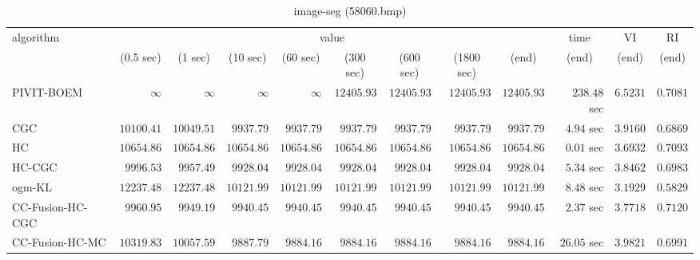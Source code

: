 \begin{table}[H]
\scriptsize
\centering
\caption{image-seg (58060.bmp)}
\label{tab:anytimetable-image-seg-58060.bmp}
\begin{tabular}{lrrrrrrrrrrr}
\toprule
           algorithm &                                   \multicolumn{8}{c}{value} & \multicolumn{1}{c}{time}    & \multicolumn{1}{c}{VI}  & \multicolumn{1}{c}{RI} \\  
\cmidrule(lr){2-9}\cmidrule(lr){10-10} \cmidrule(lr){11-11} \cmidrule(lr){12-12}   
                     & \multicolumn{1}{c}{(0.5 sec)} & \multicolumn{1}{c}{(1 sec)} & \multicolumn{1}{c}{(10 sec)} & \multicolumn{1}{c}{(60 sec)} & \multicolumn{1}{c}{(300 sec)} & \multicolumn{1}{c}{(600 sec)} & \multicolumn{1}{c}{(1800 sec)} & \multicolumn{1}{c}{(end)} & \multicolumn{1}{c}{(end)}    & \multicolumn{1}{c}{(end)}   & \multicolumn{1}{c}{(end)}  \\ \midrule 
          PIVIT-BOEM & $\infty$ & $\infty$ & $\infty$ & $\infty$ & $     12405.93$ & $     12405.93$ & $     12405.93$ & $     12405.93$ & $       238.48$ sec    & $       6.5231$  & $       0.7081$ \\ 
                 CGC & $     10100.41$ & $     10049.51$ & $      9937.79$ & $      9937.79$ & $      9937.79$ & $      9937.79$ & $      9937.79$ & $      9937.79$ & $         4.94$ sec    & $       3.9160$  & $       0.6869$ \\ 
                  HC & $     10654.86$ & $     10654.86$ & $     10654.86$ & $     10654.86$ & $     10654.86$ & $     10654.86$ & $     10654.86$ & $     10654.86$ & $         0.01$ sec    & $       3.6932$  & $       0.7093$ \\ 
              HC-CGC & $      9996.53$ & $      9957.49$ & $      9928.04$ & $      9928.04$ & $      9928.04$ & $      9928.04$ & $      9928.04$ & $      9928.04$ & $         5.34$ sec    & $       3.8462$  & $       0.6983$ \\ 
              ogm-KL & $     12237.48$ & $     12237.48$ & $     10121.99$ & $     10121.99$ & $     10121.99$ & $     10121.99$ & $     10121.99$ & $     10121.99$ & $         8.48$ sec    & $       3.1929$  & $       0.5829$ \\ 
    CC-Fusion-HC-CGC & $      9960.95$ & $      9949.19$ & $      9940.45$ & $      9940.45$ & $      9940.45$ & $      9940.45$ & $      9940.45$ & $      9940.45$ & $         2.37$ sec    & $       3.7718$  & $       0.7120$ \\ 
     CC-Fusion-HC-MC & $     10319.83$ & $     10057.59$ & $      9887.79$ & $      9884.16$ & $      9884.16$ & $      9884.16$ & $      9884.16$ & $      9884.16$ & $        26.05$ sec    & $       3.9821$  & $       0.6991$ \\ 

\end{tabular}
\end{table}
